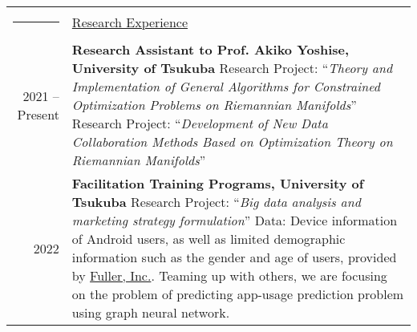\documentclass[a4paper,11pt]{article}
\newcommand{\headingfont}{\LARGE \MakeUppercase }
\newenvironment{SectionTable}[1]{
	\renewcommand*{\arraystretch}{1.0}
	\setlength{\tabcolsep}{10pt}
	\begin{longtable}{Rp{5.2in}} 
		\rule{2.3cm}{4pt} 
		& \underline{#1} \\ %
	}
	{
	\end{longtable}\vspace{-.3cm}
}
\begin{document}
\begin{SectionTable}{\headingfont Research Experience}
	2021 -- Present & 
	\textbf{Research Assistant to Prof. Akiko Yoshise, University of Tsukuba} \newline
	Research Project: ``\textit{Theory and Implementation of General Algorithms for Constrained Optimization Problems on Riemannian Manifolds}'' \newline
	Research Project: ``\textit{Development of New Data Collaboration Methods Based on Optimization Theory on Riemannian Manifolds}'' \\
	
	2022 &
	\textbf{Facilitation Training Programs, University of Tsukuba}
	\newline
	Research Project: ``\textit{Big data analysis and marketing strategy formulation}''
	\newline
	Data: Device information of Android users, as well as limited demographic information such as the gender and age of users, provided by \href{https://en.fuller-inc.com/}{Fuller, Inc.}. \newline
	Teaming up with others, we are focusing on the problem of predicting app-usage prediction problem using graph neural network.
\end{SectionTable}
\end{document}
